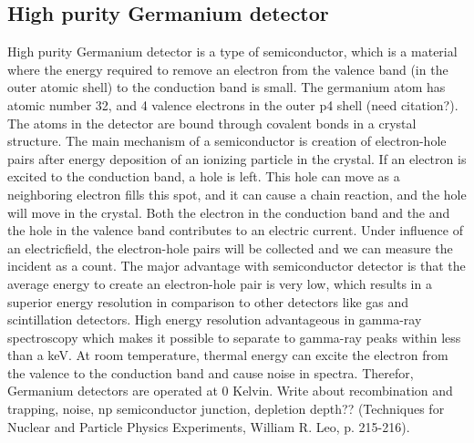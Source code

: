 \documentclass[a4paper,11pt,twoside]{book}
\begin{document}




\subsection{High purity Germanium detector}
High purity Germanium detector is a type of semiconductor, which is a material where the energy required to remove an electron from the valence band (in the outer atomic shell) to the conduction band is small. The germanium atom has atomic number 32, and 4 valence electrons in the outer p4 shell (need citation?). The atoms in the detector are bound through covalent bonds in a crystal structure. The main mechanism of a semiconductor is creation of electron-hole pairs after energy deposition of an ionizing particle in the crystal. If an electron is excited to the conduction band, a hole is left. This hole can move as a neighboring electron fills this spot, and it can cause a chain reaction, and the hole will move in the crystal. Both the electron in the conduction band and the  and the hole in the valence band contributes to an electric current. Under influence of an electricfield, the electron-hole pairs will be collected and we can measure the incident as a count. The major
advantage with semiconductor detector is that the average energy to create an electron-hole pair is
very low, which results in a superior energy resolution in comparison to other detectors like gas and
scintillation detectors. High energy resolution advantageous in gamma-ray spectroscopy which makes
it possible to separate to gamma-ray peaks within less than a keV. At room temperature, thermal
energy can excite the electron from the valence to the conduction band and cause noise in spectra.
Therefor, Germanium detectors are operated at 0 Kelvin. Write about recombination and trapping,
noise, np semiconductor junction, depletion depth?? (Techniques for Nuclear and Particle Physics Experiments, William R. Leo, p. 215-216). 
\end{document}
